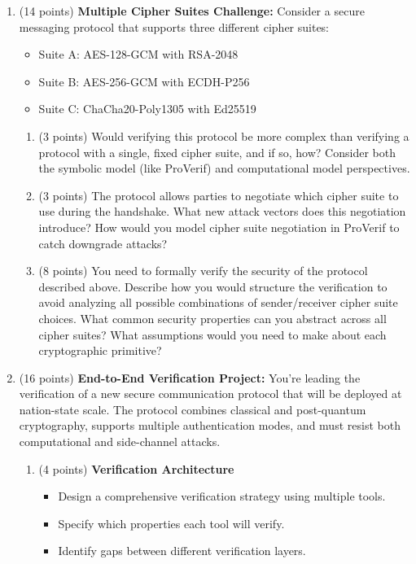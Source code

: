 \documentclass[10pt,a4paper,american]{exam}
\begin{document}
\begin{enumerate}
	\item (14 points) \textbf{Multiple Cipher Suites Challenge:}
	      Consider a secure messaging protocol that supports three different cipher suites:
	      \begin{itemize}
		      \item Suite A: AES-128-GCM with RSA-2048
		      \item Suite B: AES-256-GCM with ECDH-P256
		      \item Suite C: ChaCha20-Poly1305 with Ed25519
	      \end{itemize}

	      \begin{enumerate}
		      \item (3 points) Would verifying this protocol be more complex than verifying a protocol with a single, fixed cipher suite, and if so, how? Consider both the symbolic model (like ProVerif) and computational model perspectives.
		      \item (3 points) The protocol allows parties to negotiate which cipher suite to use during the handshake. What new attack vectors does this negotiation introduce? How would you model cipher suite negotiation in ProVerif to catch downgrade attacks?
		      \item (8 points) You need to formally verify the security of the protocol described above. Describe how you would structure the verification to avoid analyzing all possible combinations of sender/receiver cipher suite choices. What common security properties can you abstract across all cipher suites? What assumptions would you need to make about each cryptographic primitive?
	      \end{enumerate}

	\item (16 points) \textbf{End-to-End Verification Project:}
	      You're leading the verification of a new secure communication protocol that will be deployed at nation-state scale. The protocol combines classical and post-quantum cryptography, supports multiple authentication modes, and must resist both computational and side-channel attacks.
	      \begin{enumerate} \item (4 points) \textbf{Verification Architecture}
		            \begin{itemize}
			            \item Design a comprehensive verification strategy using multiple tools.
			            \item Specify which properties each tool will verify.
			            \item Identify gaps between different verification layers.
		            \end{itemize}


\end{enumerate}
\end{enumerate}
\end{document}
